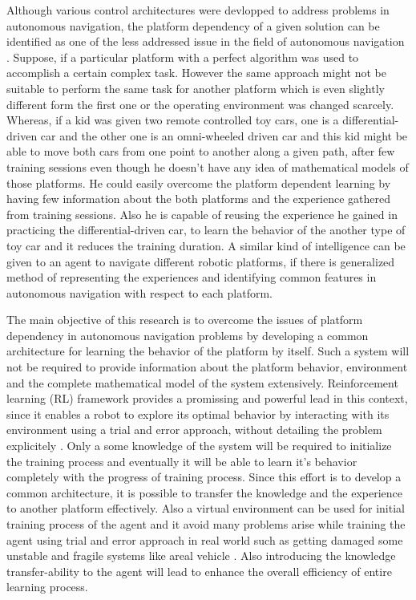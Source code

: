 \documentclass[a4paper,oneside,12pt]{report}
\begin{document}
Although various control architectures were devlopped to address problems in autonomous navigation, the platform dependency of a given solution can be identified as  one of the less addressed issue in the field of autonomous navigation \cite{R02}. Suppose, if a particular platform with a perfect algorithm was used to accomplish a certain complex task. However the same approach might not be suitable to perform the same task for another platform which is even slightly different form the first one or the operating environment was changed scarcely. Whereas, if a kid was given two remote controlled toy cars, one is a differential-driven car and the other one is an omni-wheeled driven car and this kid might be able to move both cars from one point to another along a given path, after few training sessions even though he doesn't have any idea of mathematical models of those platforms. He could easily overcome the platform dependent learning by having few information about the both platforms and the experience gathered from training sessions. Also he is capable of reusing the experience he gained in practicing the differential-driven car, to learn the behavior of the another type of toy car and it reduces the training duration. A similar kind of intelligence can be given to an agent to navigate different robotic platforms, if there is generalized method of representing the experiences and  identifying common features in autonomous navigation with respect to each platform.

The main objective of this research is to overcome the issues of platform dependency in  autonomous navigation problems by developing a common  architecture for learning the behavior of the platform by itself. Such a system will not be required to provide information about the platform behavior, environment and the complete mathematical model of the system extensively. Reinforcement learning (RL) framework provides a promissing and powerful lead \cite{R24} in this context, since it enables a robot to explore its optimal behavior by interacting with its environment using a trial and error approach, without detailing the problem explicitely \cite{R03}. Only a some knowledge of the system will be required to initialize the training process and eventually it will be able to learn it's behavior completely with the progress of training process.  Since this effort is to develop a common architecture, it is possible to transfer the knowledge and the experience to another platform effectively. Also a virtual environment can be used for initial training process \cite{R07} \cite{R08} \cite{R10} \cite{R24} of the agent and it avoid many problems arise while training the agent using trial and error approach in real world such as getting damaged some unstable and fragile systems like areal vehicle \cite{R10}. Also introducing the knowledge  transfer-ability to the agent will lead to enhance the overall efficiency of entire learning process\cite{R13}.
\end{document}
